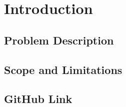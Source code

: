 \documentclass[class=report,11pt,crop=false]{standalone}
\begin{document}
\chapter{Introduction} \label{ch:introduction}
\vspace{-1cm}

\section{Problem Description}
\lipsum[1]

\section{Scope and Limitations}
\lipsum[1]

\section{GitHub Link}
\ifstandalone

\fi
\end{document}
